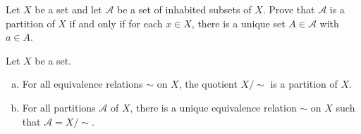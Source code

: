 \begin{exercise}
\label{exConditionsForPartition}
Let $X$ be a set and let $\mathcal{A}$ be a set of inhabited subsets of $X$. Prove that $\mathcal{A}$ is a partition of $X$ if and only if for each $x \in X$, there is a unique set $A \in \mathcal{A}$ with $a \in A$.
\end{exercise}

\begin{theorem}
\label{thmEquivalenceRelationsPartitions}
Let $X$ be a set.
\begin{enumerate}[(a)]
\item For all equivalence relations $\sim$ on $X$, the quotient $X/{\sim}$ is a partition of $X$.
\item For all partitions $\mathcal{A}$ of $X$, there is a unique equivalence relation $\sim$ on $X$ such that $\mathcal{A} = X/{\sim}$.
\end{enumerate}
\end{theorem}

